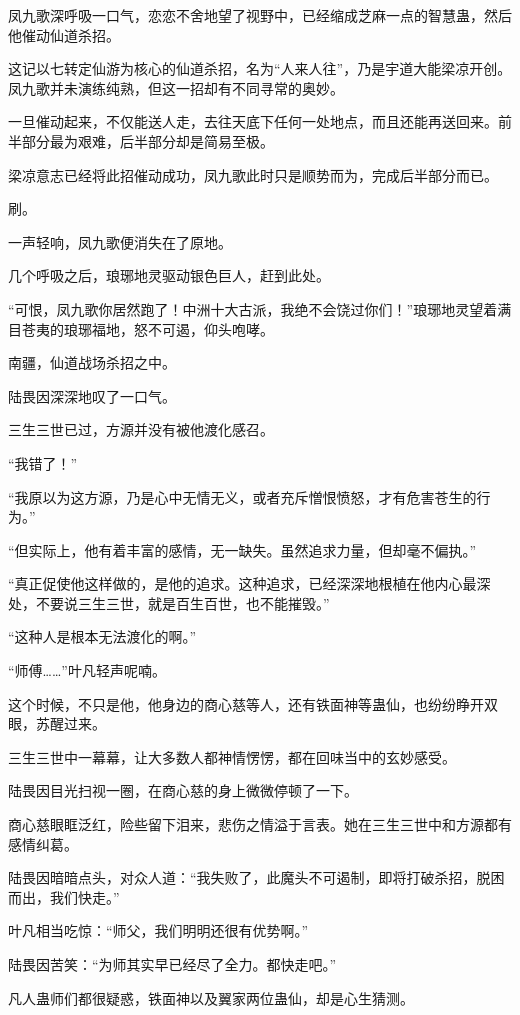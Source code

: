 \begin{this_body}
凤九歌深呼吸一口气，恋恋不舍地望了视野中，已经缩成芝麻一点的智慧蛊，然后他催动仙道杀招。

这记以七转定仙游为核心的仙道杀招，名为“人来人往”，乃是宇道大能梁凉开创。凤九歌并未演练纯熟，但这一招却有不同寻常的奥妙。

一旦催动起来，不仅能送人走，去往天底下任何一处地点，而且还能再送回来。前半部分最为艰难，后半部分却是简易至极。

梁凉意志已经将此招催动成功，凤九歌此时只是顺势而为，完成后半部分而已。

刷。

一声轻响，凤九歌便消失在了原地。

几个呼吸之后，琅琊地灵驱动银色巨人，赶到此处。

“可恨，凤九歌你居然跑了！中洲十大古派，我绝不会饶过你们！”琅琊地灵望着满目苍夷的琅琊福地，怒不可遏，仰头咆哮。

南疆，仙道战场杀招之中。

陆畏因深深地叹了一口气。

三生三世已过，方源并没有被他渡化感召。

“我错了！”

“我原以为这方源，乃是心中无情无义，或者充斥憎恨愤怒，才有危害苍生的行为。”

“但实际上，他有着丰富的感情，无一缺失。虽然追求力量，但却毫不偏执。”

“真正促使他这样做的，是他的追求。这种追求，已经深深地根植在他内心最深处，不要说三生三世，就是百生百世，也不能摧毁。”

“这种人是根本无法渡化的啊。”

“师傅……”叶凡轻声呢喃。

这个时候，不只是他，他身边的商心慈等人，还有铁面神等蛊仙，也纷纷睁开双眼，苏醒过来。

三生三世中一幕幕，让大多数人都神情愣愣，都在回味当中的玄妙感受。

陆畏因目光扫视一圈，在商心慈的身上微微停顿了一下。

商心慈眼眶泛红，险些留下泪来，悲伤之情溢于言表。她在三生三世中和方源都有感情纠葛。

陆畏因暗暗点头，对众人道：“我失败了，此魔头不可遏制，即将打破杀招，脱困而出，我们快走。”

叶凡相当吃惊：“师父，我们明明还很有优势啊。”

陆畏因苦笑：“为师其实早已经尽了全力。都快走吧。”

凡人蛊师们都很疑惑，铁面神以及翼家两位蛊仙，却是心生猜测。


\end{this_body}
